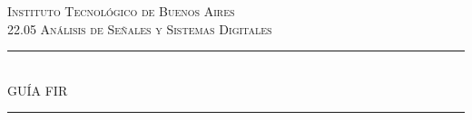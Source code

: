 \begin{titlepage}
\newcommand{\HRule}
{\rule{\linewidth}{0.5mm}}
\center
\textsc{\LARGE Instituto Tecnológico de Buenos Aires}\\[2cm]
\textsc{\Large 22.05 Análisis de Señales y Sistemas Digitales}\\[1.5cm]
%
\HRule \\[0.5cm]
\textsc{ \huge GUÍA FIR}\\[0.5cm]
\HRule \\[2cm]


\end{titlepage}
